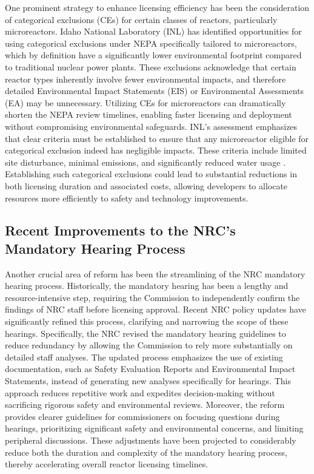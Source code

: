 \documentclass[5p,authoryear]{elsarticle}
\begin{document}
One prominent strategy to enhance licensing efficiency has been the consideration of categorical exclusions (CEs) for certain classes of reactors, particularly microreactors. Idaho National Laboratory (INL) has identified opportunities for using categorical exclusions under NEPA specifically tailored to microreactors, which by definition have a significantly lower environmental footprint compared to traditional nuclear power plants. These exclusions acknowledge that certain reactor types inherently involve fewer environmental impacts, and therefore detailed Environmental Impact Statements (EIS) or Environmental Assessments (EA) may be unnecessary. Utilizing CEs for microreactors can dramatically shorten the NEPA review timelines, enabling faster licensing and deployment without compromising environmental safeguards. INL's assessment emphasizes that clear criteria must be established to ensure that any microreactor eligible for categorical exclusion indeed has negligible impacts. These criteria include limited site disturbance, minimal emissions, and significantly reduced water usage \cite{inl2025categorical}. Establishing such categorical exclusions could lead to substantial reductions in both licensing duration and associated costs, allowing developers to allocate resources more efficiently to safety and technology improvements.

\subsection{Recent Improvements to the NRC's Mandatory Hearing Process}

Another crucial area of reform has been the streamlining of the NRC mandatory hearing process. Historically, the mandatory hearing has been a lengthy and resource-intensive step, requiring the Commission to independently confirm the findings of NRC staff before licensing approval. Recent NRC policy updates have significantly refined this process, clarifying and narrowing the scope of these hearings. Specifically, the NRC revised the mandatory hearing guidelines to reduce redundancy by allowing the Commission to rely more substantially on detailed staff analyses. The updated process emphasizes the use of existing documentation, such as Safety Evaluation Reports and Environmental Impact Statements, instead of generating new analyses specifically for hearings. This approach reduces repetitive work and expedites decision-making without sacrificing rigorous safety and environmental reviews. Moreover, the reform provides clearer guidelines for commissioners on focusing questions during hearings, prioritizing significant safety and environmental concerns, and limiting peripheral discussions. These adjustments have been projected to considerably reduce both the duration and complexity of the mandatory hearing process, thereby accelerating overall reactor licensing timelines.
\end{document}
